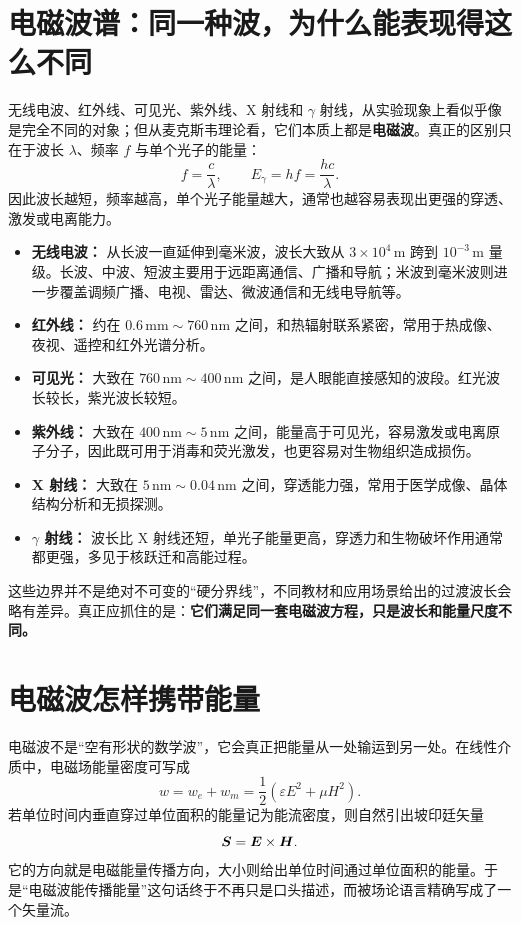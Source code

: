 \documentclass[lang=cn,11pt]{elegantbook}
\begin{document}
\section{电磁波谱：同一种波，为什么能表现得这么不同}

无线电波、红外线、可见光、紫外线、X 射线和 \(\gamma\) 射线，从实验现象上看似乎像是完全不同的对象；但从麦克斯韦理论看，它们本质上都是\textbf{电磁波}。真正的区别只在于波长 \(\lambda\)、频率 \(f\) 与单个光子的能量：
\[
f=\frac{c}{\lambda},
\qquad
E_\gamma=hf=\frac{hc}{\lambda}.
\]
因此波长越短，频率越高，单个光子能量越大，通常也越容易表现出更强的穿透、激发或电离能力。

\begin{itemize}
  \item \textbf{无线电波：} 从长波一直延伸到毫米波，波长大致从 \(3\times 10^4\,\mathrm{m}\) 跨到 \(10^{-3}\,\mathrm{m}\) 量级。长波、中波、短波主要用于远距离通信、广播和导航；米波到毫米波则进一步覆盖调频广播、电视、雷达、微波通信和无线电导航等。
  \item \textbf{红外线：} 约在 \(0.6\,\mathrm{mm}\sim 760\,\mathrm{nm}\) 之间，和热辐射联系紧密，常用于热成像、夜视、遥控和红外光谱分析。
  \item \textbf{可见光：} 大致在 \(760\,\mathrm{nm}\sim 400\,\mathrm{nm}\) 之间，是人眼能直接感知的波段。红光波长较长，紫光波长较短。
  \item \textbf{紫外线：} 大致在 \(400\,\mathrm{nm}\sim 5\,\mathrm{nm}\) 之间，能量高于可见光，容易激发或电离原子分子，因此既可用于消毒和荧光激发，也更容易对生物组织造成损伤。
  \item \textbf{X 射线：} 大致在 \(5\,\mathrm{nm}\sim 0.04\,\mathrm{nm}\) 之间，穿透能力强，常用于医学成像、晶体结构分析和无损探测。
  \item \textbf{\(\gamma\) 射线：} 波长比 X 射线还短，单光子能量更高，穿透力和生物破坏作用通常都更强，多见于核跃迁和高能过程。
\end{itemize}

\begin{remark}
这些边界并不是绝对不可变的“硬分界线”，不同教材和应用场景给出的过渡波长会略有差异。真正应抓住的是：\textbf{它们满足同一套电磁波方程，只是波长和能量尺度不同。}
\end{remark}

\section{电磁波怎样携带能量}

电磁波不是“空有形状的数学波”，它会真正把能量从一处输运到另一处。在线性介质中，电磁场能量密度可写成
\[
w=w_e+w_m
=\frac12\left(\varepsilon E^2+\mu H^2\right).
\]
若单位时间内垂直穿过单位面积的能量记为能流密度，则自然引出坡印廷矢量
\[
\vb*{S}=\vb*{E}\times \vb*{H}.
\]
它的方向就是电磁能量传播方向，大小则给出单位时间通过单位面积的能量。于是“电磁波能传播能量”这句话终于不再只是口头描述，而被场论语言精确写成了一个矢量流。
\end{document}
